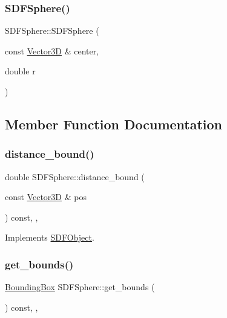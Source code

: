 \subsubsection{\texorpdfstring{SDFSphere()}{SDFSphere()}}
{\footnotesize\ttfamily S\+D\+F\+Sphere\+::\+S\+D\+F\+Sphere (\begin{DoxyParamCaption}\item[{const \mbox{\hyperlink{classVector3D}{Vector3D}} \&}]{center,  }\item[{double}]{r }\end{DoxyParamCaption})}



\subsection{Member Function Documentation}
\mbox{\label{classSDFSphere_aba1d5f7d9f16ee7fd40c5dae5df467d1}} 
\subsubsection{\texorpdfstring{distance\_bound()}{distance\_bound()}}
{\footnotesize\ttfamily double S\+D\+F\+Sphere\+::distance\+\_\+bound (\begin{DoxyParamCaption}\item[{const \mbox{\hyperlink{classVector3D}{Vector3D}} \&}]{pos }\end{DoxyParamCaption}) const\hspace{0.3cm}{\ttfamily [override]}, {\ttfamily [private]}, {\ttfamily [virtual]}}



Implements \mbox{\hyperlink{classSDFObject_ac34f5232b6ea395178d33e3b084d5a93}{S\+D\+F\+Object}}.

\mbox{\label{classSDFSphere_a9a0e4c9feb32bcd2ce78a3027d3ce2ad}} 
\subsubsection{\texorpdfstring{get\_bounds()}{get\_bounds()}}
{\footnotesize\ttfamily \mbox{\hyperlink{classBoundingBox}{Bounding\+Box}} S\+D\+F\+Sphere\+::get\+\_\+bounds (\begin{DoxyParamCaption}{ }\end{DoxyParamCaption}) const\hspace{0.3cm}{\ttfamily [inline]}, {\ttfamily [override]}, {\ttfamily [virtual]}}



